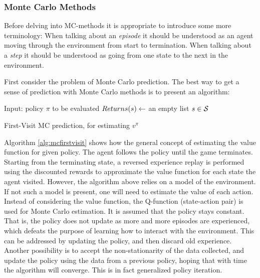 \subsubsection{Monte Carlo Methods}

Before delving into MC-methods it is appropriate to introduce some more terminology: When talking about an \textit{episode} it should be understood as an agent moving through the environment from start to termination. When talking about a \textit{step} it should be understood as going from one state to the next in the environment. 

First consider the problem of Monte Carlo prediction. The best way to get a sense of prediction with Monte Carlo methods is to present an algorithm:

\begin{algorithm}[H]
\SetAlgoLined
{}
 Input: policy $\pi$ to be evaluated\;
 $Returns(s) \leftarrow$ an empty list $s \in \mathcal{S}$\; 
 \caption{First-Visit MC prediction, for estimating $v^{\pi}$}
 \label{alg:mcfirstvisit}
\end{algorithm}

Algorithm \ref{alg:mcfirstvisit} shows how the general concept of estimating the value function for given policy. The agent follows the policy until the game terminates. Starting from the terminating state, a reversed experience replay is performed using the discounted rewards to approximate the value function for each state the agent visited. However, the algorithm above relies on a model of the environment. If not such a model is present, one will need to estimate the value of each action. Instead of considering the value function, the Q-function (state-action pair) is used for Monte Carlo estimation. It is assumed that the policy stays constant. That is, the policy does not update as more and more episodes are experienced, which defeats the purpose of learning how to interact with the environment. This can be addressed by updating the policy, and then discard old experience. Another possibility is to accept the non-stationarity of the data collected, and update the policy using the data from a previous policy, hoping that with time the algorithm will converge. This is in fact generalized policy iteration.

